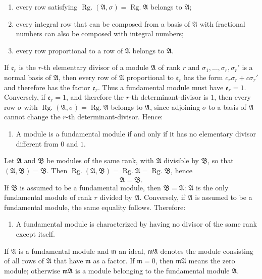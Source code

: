 \documentclass[11pt]{article}
\newcommand{\Rg}{\operatorname{Rg.}}
\begin{document}
\begin{enumerate}
\item[1)] every row satisfying $\Rg(\mathfrak A,\sigma)=\Rg\mathfrak A$ belongs to $\mathfrak A$;
\item[2)] every integral row that can be composed from a basis of $\mathfrak A$ with fractional numbers can also be composed with integral numbers;
\item[3)] every row proportional to a row of $\mathfrak A$ belongs to $\mathfrak A$.
\end{enumerate}
If $\mathfrak e_r$ is the $r$-th elementary divisor of a module $\mathfrak A$ of rank $r$ and $\sigma_1,
\ldots,
\sigma_r,
\sigma_r'$ is a normal basis of $\mathfrak A$, then every row of $\mathfrak A$ proportional to $\mathfrak e_r$ has the form $c_r\sigma_r+c\sigma_r'$ and therefore has the factor $\mathfrak e_r$. Thus a fundamental module must have $\mathfrak e_r=1$. Conversely, if $\mathfrak e_r=1$, and therefore the $r$-th determinant-divisor is $1$, then every row $\sigma$ with $\Rg(\mathfrak A,
\sigma)=\Rg\mathfrak A$ belongs to $\mathfrak A$, since adjoining $\sigma$ to a basis of $\mathfrak A$ cannot change the $r$-th determinant-divisor. Hence:

\begin{enumerate}
\item[4)] A module is a fundamental module if and only if it has no elementary divisor different from $0$ and $1$.
\end{enumerate}

Let $\mathfrak A$ and $\mathfrak B$ be modules of the same rank, with $\mathfrak A$ divisible by $\mathfrak B$, so that $(\mathfrak A,\mathfrak B)=\mathfrak B$. Then $\Rg(\mathfrak A,
\mathfrak B)=\Rg\mathfrak A=\Rg\mathfrak B$, hence
\[
\overline{\mathfrak A}=\overline{\mathfrak B}.
\]
If $\mathfrak B$ is assumed to be a fundamental module, then $\mathfrak B=\mathfrak A$: $\mathfrak A$ is the only fundamental module of rank $r$ divided by $\mathfrak A$. Conversely, if $\mathfrak A$ is assumed to be a fundamental module, the same equality follows. Therefore:

\begin{enumerate}
\item[5)] A fundamental module is characterized by having no divisor of the same rank except itself.
\end{enumerate}

If $\mathfrak A$ is a fundamental module and $\mathfrak m$ an ideal, $\mathfrak m\mathfrak A$ denotes the module consisting of all rows of $\mathfrak A$ that have $\mathfrak m$ as a factor. If $\mathfrak m=0$, then $\mathfrak m\mathfrak A$ means the zero module; otherwise $\mathfrak m\mathfrak A$ is a module belonging to the fundamental module $\mathfrak A$.
\end{document}
